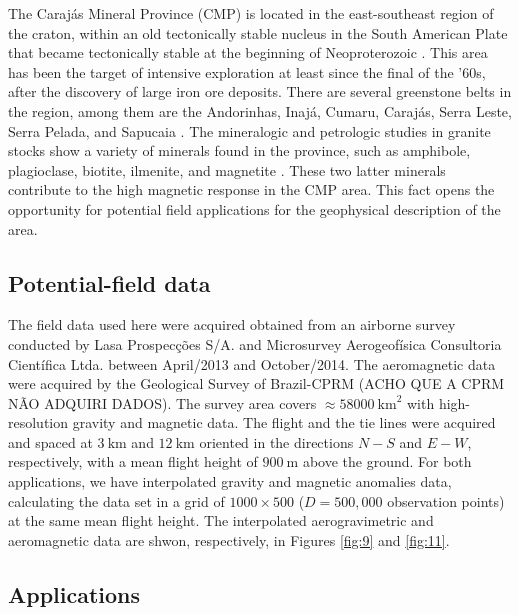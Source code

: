 The Caraj{\'a}s Mineral Province (CMP) is located in the east-southeast region of the craton, within an old tectonically stable nucleus in the 
South American Plate that became tectonically stable at the beginning of Neoproterozoic \citep{salomao-etal2019}. 
This area has been the target of intensive exploration at least since the final of the '60s, after the discovery of large iron ore deposits. 
There are several greenstone belts in the region, among them are the Andorinhas, Inajá, Cumaru, Caraj{\'a}s, Serra Leste, Serra Pelada, and Sapucaia 
\citep{santos-etal2000}. The mineralogic and petrologic studies in granite stocks show a variety of minerals found in the province, such as 
amphibole, plagioclase, biotite, ilmenite, and magnetite \citep{cunha-etal2016}. These two latter minerals contribute to the high magnetic 
response in the CMP area. This fact opens the opportunity for potential field applications for the geophysical description of the area. 

\subsection{Potential-field data}

The field data used here were acquired obtained from an airborne survey conducted by Lasa Prospec{\c c}{\~o}es S/A. 
and Microsurvey Aerogeof{\'i}sica Consultoria Cient{\'i}fica Ltda. between April/2013 and October/2014.
The aeromagnetic data were acquired by the Geological Survey of Brazil-CPRM (ACHO QUE A CPRM NÃO ADQUIRI DADOS).
The survey area covers $\approx 58000 \: \mathrm{km}^2$ with high-resolution gravity and magnetic data. 
The flight and the tie lines were acquired and spaced at $3 \: \mathrm{km}$  and $12 \: \mathrm{km}$ oriented in the 
directions $N-S$ and $E-W$, respectively, with a mean flight height of $900 \: \mathrm{m}$ above the ground. 
For both applications, we have interpolated gravity and magnetic anomalies data, calculating the data set in a grid of 
$1000 \times 500$ ($D = 500,000$ observation points) at the same mean flight height. 
The interpolated aerogravimetric and aeromagnetic data are shwon, respectively, in Figures \ref{fig:9} and \ref{fig:11}. 

\subsection{Applications}

